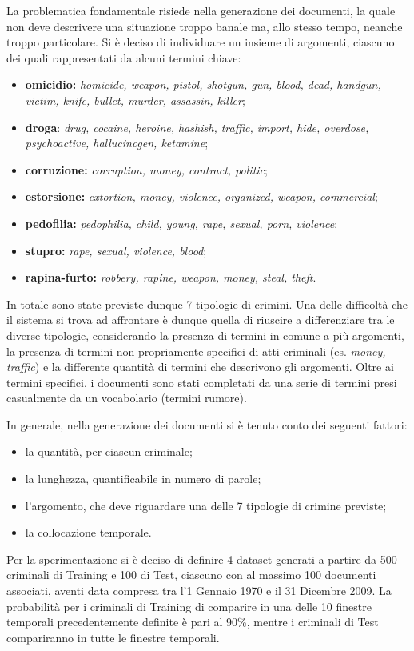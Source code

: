 La problematica fondamentale risiede nella generazione dei documenti, la quale non deve descrivere una situazione troppo banale ma, allo stesso tempo, neanche troppo particolare. Si è deciso di individuare un insieme di argomenti, ciascuno dei quali rappresentati da alcuni termini chiave:

\begin{itemize}
	\item \textbf{omicidio:} \emph{homicide, weapon, pistol, shotgun, gun, blood, dead, handgun, victim, knife, bullet, murder, assassin, killer};
	\item \textbf{droga}: \emph{drug, cocaine, heroine, hashish, traffic, import, hide, overdose, psychoactive, hallucinogen, ketamine};
	\item \textbf{corruzione:} \emph{corruption, money, contract, politic};
	\item \textbf{estorsione:} \emph{extortion, money, violence, organized, weapon, commercial};
	\item \textbf{pedofilia:} \emph{pedophilia, child, young, rape, sexual, porn, violence};
	\item \textbf{stupro:} \emph{rape, sexual, violence, blood};
	\item \textbf{rapina-furto:} \emph{robbery, rapine, weapon, money, steal, theft}.
\end{itemize}

In totale sono state previste dunque 7 tipologie di crimini. Una delle difficoltà che il sistema si trova ad affrontare è dunque quella di riuscire a differenziare tra le diverse tipologie, considerando la presenza di termini in comune a più argomenti, la presenza di termini non propriamente specifici di atti criminali (es. \emph{money, traffic}) e la differente quantità di termini che descrivono gli argomenti. Oltre ai termini specifici, i documenti sono stati completati da una serie di termini presi casualmente da un vocabolario (termini rumore). 

In generale, nella generazione dei documenti si è tenuto conto dei seguenti fattori: 
\begin{itemize}
	\item la quantità, per ciascun criminale;
	\item la lunghezza, quantificabile in numero di parole;
	\item l'argomento, che deve riguardare una delle 7 tipologie di crimine previste;
	\item la collocazione temporale.
\end{itemize}
Per la sperimentazione si è deciso di definire 4 dataset generati a partire da 500 criminali di Training e 100 di Test, ciascuno con al massimo 100 documenti associati, aventi data compresa tra l'1 Gennaio 1970 e il 31 Dicembre 2009. La probabilità per i criminali di Training di comparire in una delle 10 finestre temporali precedentemente definite è pari al 90\%, mentre i criminali di Test compariranno in tutte le finestre temporali.
 
